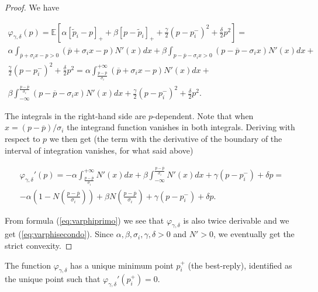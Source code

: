 \documentclass[graybox]{svmult}
\begin{document}
\begin{proof}
We have

\[
\begin{array}{ll}
\displaystyle
\varphi_{\gamma,\delta}(p)=\mathbb{E}\left[\alpha[\tilde p_i-p]_++\beta[p-\tilde p_i]_++\frac{\gamma}{2}(p-p_i^-)^2+\frac{\delta}{2}p^2\right]=\\
\displaystyle
\alpha\int_{\overline p+\sigma_ix-p>0}(\overline p+\sigma_ix-p)N'(x)dx+\beta\int_{p-\overline p-\sigma_ix>0}(p-\overline p-\sigma_ix)N'(x)dx+\\
\displaystyle
\frac{\gamma}{2}(p-p_i^-)^2+\frac{\delta}{2}p^2=\alpha\int_{\frac{p-\overline p}{\sigma_i}}^{+\infty}(\overline p+\sigma_ix-p)N'(x)dx+\\
\displaystyle
\beta\int_{-\infty}^{\frac{p-\overline p}{\sigma_i}}(p-\overline p-\sigma_ix)N'(x)dx+\frac{\gamma}{2}(p-p_i^-)^2+\frac{\delta}{2}p^2.
\end{array}
\]

\noindent
The integrals in the right-hand side are $p$-dependent. Note that when $x=(p-\overline p)/\sigma_i$ the integrand function vanishes in both integrals. Deriving with respect to $p$ we then get (the term with the derivative of the boundary of the interval of integration vanishes, for what said above)

\begin{equation}
\begin{array}{ll}
\displaystyle
\varphi_{\gamma,\delta}'(p)=-\alpha\int_{\frac{p-\overline p}{\sigma_i}}^{+\infty}N'(x)dx+\beta\int_{-\infty}^{\frac{p-\overline p}{\sigma_i}}N'(x)dx+\gamma(p-p_i^-)+\delta p=\\
\displaystyle
-\alpha\left(1-N\left(\frac{p-\overline p}{\sigma_i}\right)\right)+\beta N\left(\frac{p-\overline p}{\sigma_i}\right)+\gamma(p-p_i^-)+\delta p.
\end{array}
\end{equation}

\noindent
From formula (\ref{eq:varphiprimo}) we see that $\varphi_{\gamma,\delta}$ is also twice derivable and we get (\ref{eq:varphisecondo}). Since $\alpha,\beta,\sigma_i,\gamma,\delta>0$ and $N'>0$, we eventually get the strict convexity.

\end{proof}

\begin{corollary}
\label{cor:varphi}
The function $\varphi_{\gamma,\delta}$ has a unique minimum point $p_i^+$ (the best-reply), identified as the unique point such that $\varphi_{\gamma,\delta}'(p_i^+)=0$.
\end{corollary}
\end{document}

